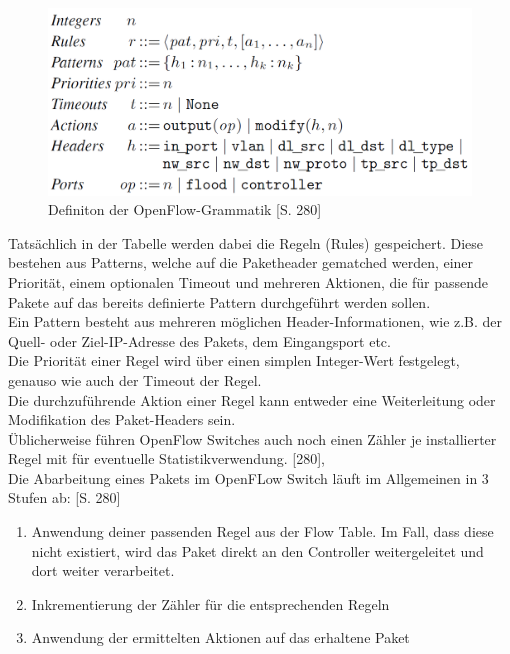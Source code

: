 \documentclass[10pt,conference]{IEEEtran}
\begin{document}
\begin{figure}[h]
	\centering
	\includegraphics[width=\columnwidth]{images/openflowDefinition.PNG}
	\caption{Definiton der OpenFlow-Grammatik \cite{4}[S. 280]}
	\label{fig:openflowDefinition}
\end{figure}
\newline
Tatsächlich in der Tabelle werden dabei die Regeln (Rules) gespeichert. Diese bestehen aus Patterns, welche auf die Paketheader gematched werden, einer Priorität, einem optionalen Timeout und mehreren Aktionen, die für passende Pakete auf das bereits definierte Pattern durchgeführt werden sollen.\\
Ein Pattern besteht aus mehreren möglichen Header-Informationen, wie z.B. der Quell- oder Ziel-IP-Adresse des Pakets, dem Eingangsport etc.\\
Die Priorität einer Regel wird über einen simplen Integer-Wert festgelegt, genauso wie auch der Timeout der Regel.\\
Die durchzuführende Aktion einer Regel kann entweder eine Weiterleitung oder Modifikation des Paket-Headers sein. \\
Üblicherweise führen OpenFlow Switches auch noch einen Zähler je installierter Regel mit für eventuelle Statistikverwendung. \cite{4}[280], \cite{11}\\
\newline
Die Abarbeitung eines Pakets im OpenFLow Switch läuft im Allgemeinen in 3 Stufen ab: \cite{4}[S. 280] \cite{1}
\begin{enumerate}
	\item Anwendung deiner passenden Regel aus der Flow Table. Im Fall, dass diese nicht existiert, wird das Paket direkt an den Controller weitergeleitet und dort weiter verarbeitet.
	\item Inkrementierung der Zähler für die entsprechenden Regeln
	\item Anwendung der ermittelten Aktionen auf das erhaltene Paket
\end{enumerate}
\end{document}
